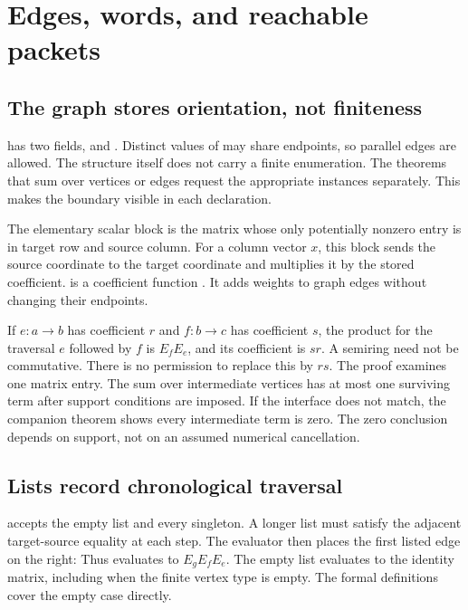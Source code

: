 \clearpage
\section{Edges, words, and reachable packets}
\subsection{The graph stores orientation, not finiteness}
 has two fields,  and . Distinct values of  may share endpoints, so parallel edges are allowed. The structure itself does not carry a finite enumeration. The theorems that sum over vertices or edges request the appropriate  instances separately. This makes the boundary visible in each declaration.

The elementary scalar block is the matrix whose only potentially nonzero entry is in target row and source column.
For a column vector $x$, this block sends the source coordinate to the target coordinate and multiplies it by the stored coefficient.  is a coefficient function . It adds weights to graph edges without changing their endpoints.

If $e:a\to b$ has coefficient $r$ and $f:b\to c$ has coefficient $s$, the product for the traversal $e$ followed by $f$ is $E_fE_e$, and its coefficient is $sr$. A semiring need not be commutative. There is no permission to replace this by $rs$.
The proof examines one matrix entry. The sum over intermediate vertices has at most one surviving term after support conditions are imposed. If the interface does not match, the companion theorem  shows every intermediate term is zero. The zero conclusion depends on support, not on an assumed numerical cancellation.

\subsection{Lists record chronological traversal}
 accepts the empty list and every singleton. A longer list must satisfy the adjacent target-source equality at each step. The evaluator then places the first listed edge on the right:
Thus \code{[e,f,g]} evaluates to $E_gE_fE_e$. The empty list evaluates to the identity matrix, including when the finite vertex type is empty. The formal definitions cover the empty case directly.

